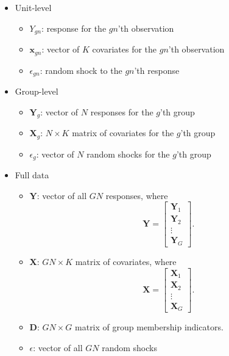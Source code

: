 \documentclass[
  12pt,
  oneside,openany]{book}
\providecommand{\tightlist}{%
  \setlength{\itemsep}{0pt}\setlength{\parskip}{0pt}}
\begin{document}
\begin{itemize}
\tightlist
\item
  Unit-level

  \begin{itemize}
  \tightlist
  \item
    \(Y_{gn}\): response for the \(gn\)'th observation
  \item
    \(\mathbf{x}_{gn}\): vector of \(K\) covariates for the \(gn\)'th observation
  \item
    \(\epsilon_{gn}\): random shock to the \(gn\)'th response
  \end{itemize}
\item
  Group-level

  \begin{itemize}
  \tightlist
  \item
    \(\mathbf{Y}_g\): vector of \(N\) responses for the \(g\)'th group
  \item
    \(\mathbf{X}_g\): \(N \times K\) matrix of covariates for the \(g\)'th group
  \item
    \(\epsilon_g\): vector of \(N\) random shocks for the \(g\)'th group
  \end{itemize}
\item
  Full data

  \begin{itemize}
  \tightlist
  \item
    \(\mathbf{Y}\): vector of all \(GN\) responses, where \[\mathbf{Y} = \begin{bmatrix} \mathbf{Y}_1 \\ \mathbf{Y}_2 \\ \vdots \\ \mathbf{Y}_G \end{bmatrix}.\]
  \item
    \(\mathbf{X}\): \(GN \times K\) matrix of covariates, where \[\mathbf{X} = \begin{bmatrix} \mathbf{X}_1 \\ \mathbf{X}_2 \\ \vdots \\ \mathbf{X}_G \end{bmatrix}.\]
  \item
    \(\mathbf{D}\): \(GN \times G\) matrix of group membership indicators.
  \item
    \(\epsilon\): vector of all \(GN\) random shocks
  \end{itemize}
\end{itemize}
\end{document}
